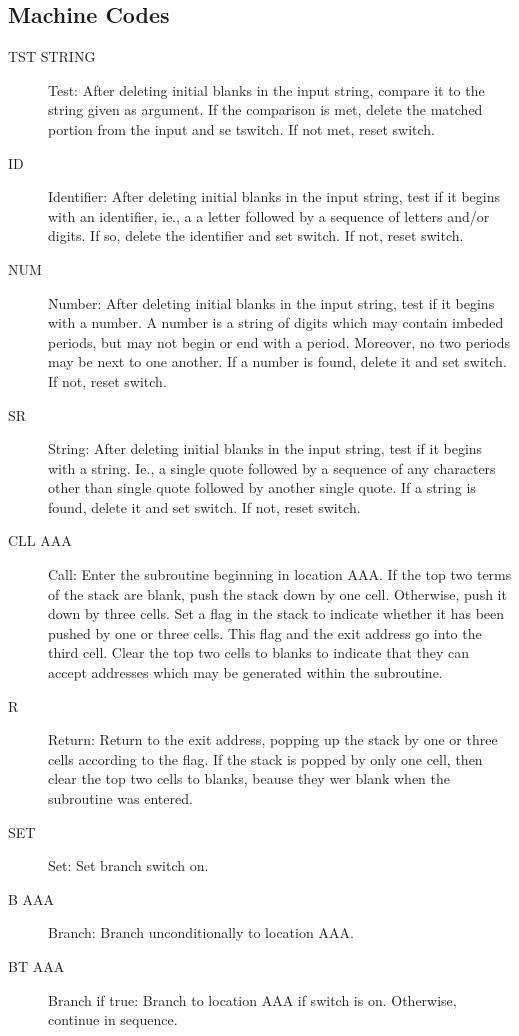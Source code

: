 \documentclass[twocolumn]{article}
\begin{document}
\subsection{Machine Codes}
\begin{description}
\item[TST STRING] Test: After deleting initial blanks in the input string,
compare it to the string given as argument. If the comparison is met,
delete the matched portion from the input and se tswitch. If not met,
reset switch.
\item[ID] Identifier: After deleting initial blanks in the input string,
test if it begins with an identifier, ie., a a letter followed by a sequence
of letters and/or digits. If so, delete the identifier and set switch.
If not, reset switch.
\item[NUM] Number: After deleting initial blanks in the input string, test
if it begins with a number. A number is a string of digits which may contain
imbeded periods, but may not begin or end with a period. 
Moreover, no two periods may be next to one another.
If a number is found, delete it and set switch.
If not, reset switch.
\item[SR] String: After deleting initial blanks in the input string, test if
it begins with a string. Ie., a single quote followed by a sequence of any
characters other than single quote followed by another single quote.
If a string is found, delete it and set switch.
If not, reset switch.
\item[CLL AAA] Call: Enter the subroutine beginning in location AAA.
If the top two terms of the stack are blank, push the stack down by one cell.
Otherwise, push it down by three cells.
Set a flag in the stack to indicate whether it has been pushed by one
or three cells.
This flag and the exit address go into the third cell.
Clear the top two cells to blanks to indicate that they can accept addresses
which may be generated within the subroutine.
\item[R] Return: Return to the exit address, popping up the stack by one
or three cells according to the flag.
If the stack is popped by only one cell, then clear the top two cells to
blanks, beause they wer blank when the subroutine was entered.
\item[SET] Set: Set branch switch on.
\item[B   AAA] Branch: Branch unconditionally to location AAA.
\item[BT  AAA] Branch if true: Branch to location AAA if switch is on.
Otherwise, continue in sequence.

\end{description}
\end{document}
